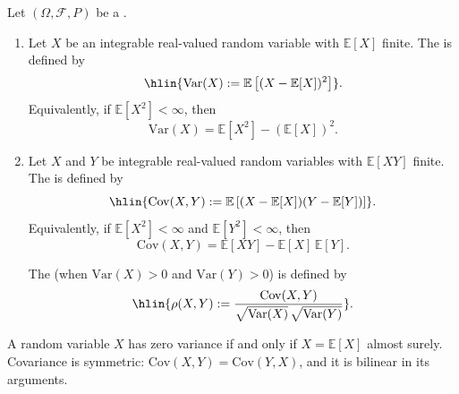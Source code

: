 \begin{definition} \label{definition:variance_and_covariance}
Let $(\Omega, \mathcal{F}, P)$ be a .

\begin{enumerate}
    \item Let $X$ be an integrable real-valued random variable with $\mathbb{E}[X]$ finite. The  is defined by
    $$\hlin{\mathrm{Var}(X) := \mathbb{E}\left[(X - \mathbb{E}[X])^2\right]}.$$
    Equivalently, if $\mathbb{E}[X^2] < \infty$, then
    $$\mathrm{Var}(X) = \mathbb{E}[X^2] - (\mathbb{E}[X])^2.$$

    \item Let $X$ and $Y$ be integrable real-valued random variables with $\mathbb{E}[XY]$ finite. The  is defined by
    $$\hlin{\mathrm{Cov}(X, Y) := \mathbb{E}\left[(X - \mathbb{E}[X])(Y - \mathbb{E}[Y])\right]}.$$
    Equivalently, if $\mathbb{E}[X^2] < \infty$ and $\mathbb{E}[Y^2] < \infty$, then
    $$\mathrm{Cov}(X, Y) = \mathbb{E}[XY] - \mathbb{E}[X]\,\mathbb{E}[Y].$$

    The  (when $\mathrm{Var}(X) > 0$ and $\mathrm{Var}(Y) > 0$) is defined by
    $$\hlin{\rho(X, Y) := \frac{\mathrm{Cov}(X, Y)}{\sqrt{\mathrm{Var}(X)}\,\sqrt{\mathrm{Var}(Y)}}}.$$
\end{enumerate}

A random variable $X$ has zero variance if and only if $X = \mathbb{E}[X]$ almost surely. Covariance is symmetric: $\mathrm{Cov}(X, Y) = \mathrm{Cov}(Y, X)$, and it is bilinear in its arguments.
\end{definition}
